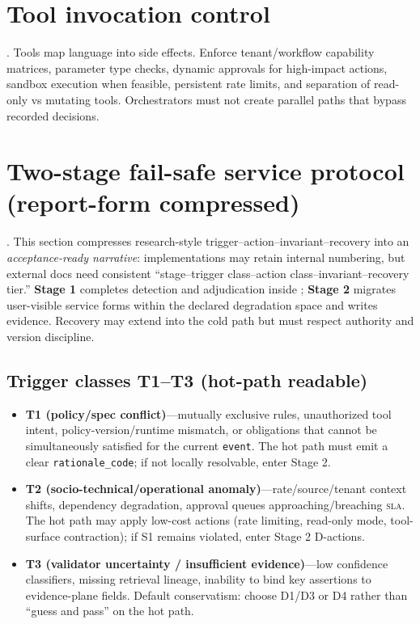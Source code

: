 \documentclass[11pt,a4paper]{report}
\begin{document}
\section{Tool invocation control}
\ControlPlane{}. Tools map language into side effects. Enforce tenant/workflow capability matrices, parameter type checks, dynamic approvals for high-impact actions, sandbox execution when feasible, persistent rate limits, and separation of read-only vs mutating tools. Orchestrators must not create parallel paths that bypass recorded decisions.

\section{Two-stage fail-safe service protocol (report-form compressed)}
\DecoupledSafety{}. This section compresses research-style trigger–action–invariant–recovery into an \emph{acceptance-ready narrative}: implementations may retain internal numbering, but external docs need consistent “stage–trigger class–action class–invariant–recovery tier.” \textbf{Stage 1} completes detection and adjudication inside \SafetyKernel{}; \textbf{Stage 2} migrates user-visible service forms within the declared degradation space and writes evidence. Recovery may extend into the cold path but must respect authority and version discipline.

\subsection{Trigger classes T1--T3 (hot-path readable)}
\begin{itemize}
  \item \textbf{T1 (policy/spec conflict)}—mutually exclusive rules, unauthorized tool intent, policy-version/runtime mismatch, or obligations that cannot be simultaneously satisfied for the current \texttt{event}. The hot path must emit a clear \texttt{rationale\_code}; if not locally resolvable, enter Stage 2.
  \item \textbf{T2 (socio-technical/operational anomaly)}—rate/source/tenant context shifts, dependency degradation, approval queues approaching/breaching \textsc{sla}. The hot path may apply low-cost actions (rate limiting, read-only mode, tool-surface contraction); if S1 remains violated, enter Stage 2 D-actions.
  \item \textbf{T3 (validator uncertainty / insufficient evidence)}—low confidence classifiers, missing retrieval lineage, inability to bind key assertions to evidence-plane fields. Default conservatism: choose D1/D3 or D4 rather than “guess and pass” on the hot path.
\end{itemize}
\end{document}

